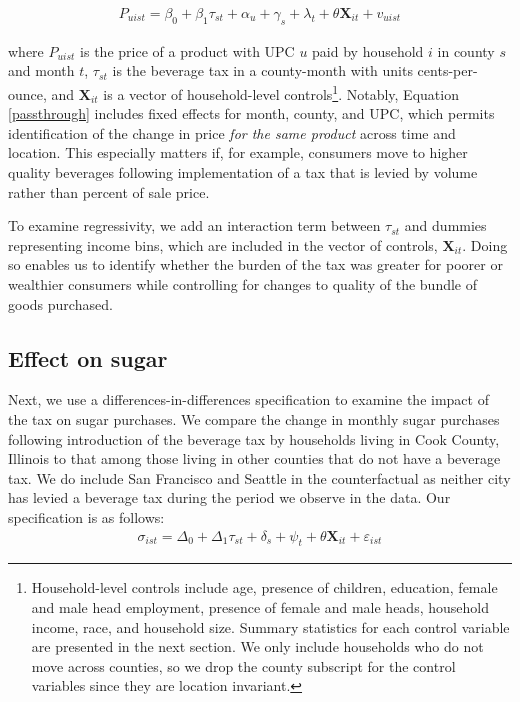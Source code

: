 \documentclass[12pt]{article}
\begin{document}
\begin{align}
	P_{uist} = \beta_0 + \beta_1\tau_{st} + \alpha_u + \gamma_s + \lambda_t + \theta \mathbf{X}_{it} + v_{uist} \label{passthrough}
\end{align}

where $P_{uist}$ is the price of a product with UPC $u$ paid by household $i$ in county $s$ and month $t$, $\tau_{st}$ is the beverage tax in a county-month with units cents-per-ounce, and $\mathbf{X}_{it}$ is a vector of household-level controls\footnote{Household-level controls include age, presence of children, education, female and male head employment, presence of female and male heads, household income, race, and household size. Summary statistics for each control variable are presented in the next section. We only include households who do not move across counties, so we drop the county subscript for the control variables since they are location invariant.}. Notably, Equation \ref{passthrough} includes fixed effects for month, county, and UPC, which permits identification of the change in price \textit{for the same product} across time and location. This especially matters if, for example, consumers move to higher quality beverages following implementation of a tax that is levied by volume rather than percent of sale price.

To examine regressivity, we add an interaction term between $\tau_{st}$ and dummies representing income bins, which are included in the vector of controls, $\mathbf{X}_{it}$. Doing so enables us to identify whether the burden of the tax was greater for poorer or wealthier consumers while controlling for changes to quality of the bundle of goods purchased.

\subsection{Effect on sugar}

Next, we use a differences-in-differences specification to examine the impact of the tax on sugar purchases. We compare the change in monthly sugar purchases following introduction of the beverage tax by households living in Cook County, Illinois to that among those living in other counties that do not have a beverage tax. We do include San Francisco and Seattle in the counterfactual as neither city has levied a beverage tax during the period we observe in the data. %
Our specification is as follows:
\begin{align}
	\sigma_{ist} = \Delta_0 + \Delta_1 \tau_{st} + \delta_s + \psi_t + \theta \mathbf{X}_{it} + \varepsilon_{ist} \label{baseline}
\end{align}
\end{document}
